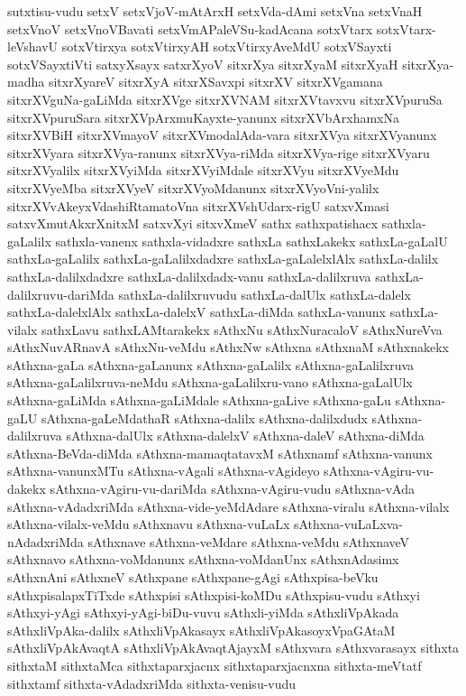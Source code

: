 {sutxtisu-vudu
setxV
setxVjoV-mAtArxH
setxVda-dAmi
setxVna
setxVnaH
setxVnoV
setxVnoVBavati
setxVmAPaleVSu-kadAcana
sotxVtarx
sotxVtarx-leVshavU
sotxVtirxya
sotxVtirxyAH
sotxVtirxyAveMdU
sotxVSayxti
sotxVSayxtiVti
satxyXsayx
satxrXyoV
sitxrXya
sitxrXyaM
sitxrXyaH
sitxrXya-madha
sitxrXyareV
sitxrXyA
sitxrXSavxpi
sitxrXV
sitxrXVgamana
sitxrXVguNa-gaLiMda
sitxrXVge
sitxrXVNAM
sitxrXVtavxvu
sitxrXVpuruSa
sitxrXVpuruSara
sitxrXVpArxmuKayxte-yanunx
sitxrXVbArxhamxNa
sitxrXVBiH
sitxrXVmayoV
sitxrXVmodalAda-vara
sitxrXVya
sitxrXVyanunx
sitxrXVyara
sitxrXVya-ranunx
sitxrXVya-riMda
sitxrXVya-rige
sitxrXVyaru
sitxrXVyalilx
sitxrXVyiMda
sitxrXVyiMdale
sitxrXVyu
sitxrXVyeMdu
sitxrXVyeMba
sitxrXVyeV
sitxrXVyoMdanunx
sitxrXVyoVni-yalilx
sitxrXVvAkeyxVdashiRtamatoVna
sitxrXVshUdarx-rigU
satxvXmasi
satxvXmutAkxrXnitxM
satxvXyi
sitxvXmeV
sathx
sathxpatishacx
sathxla-gaLalilx
sathxla-vanenx
sathxla-vidadxre
sathxLa
sathxLakekx
sathxLa-gaLalU
sathxLa-gaLalilx
sathxLa-gaLalilxdadxre
sathxLa-gaLalelxlAlx
sathxLa-dalilx
sathxLa-dalilxdadxre
sathxLa-dalilxdadx-vanu
sathxLa-dalilxruva
sathxLa-dalilxruvu-dariMda
sathxLa-dalilxruvudu
sathxLa-dalUlx
sathxLa-dalelx
sathxLa-dalelxlAlx
sathxLa-dalelxV
sathxLa-diMda
sathxLa-vanunx
sathxLa-vilalx
sathxLavu
sathxLAMtarakekx
sAthxNu
sAthxNuracaloV
sAthxNureVva
sAthxNuvARnavA
sAthxNu-veMdu
sAthxNw
sAthxna
sAthxnaM
sAthxnakekx
sAthxna-gaLa
sAthxna-gaLanunx
sAthxna-gaLalilx
sAthxna-gaLalilxruva
sAthxna-gaLalilxruva-neMdu
sAthxna-gaLalilxru-vano
sAthxna-gaLalUlx
sAthxna-gaLiMda
sAthxna-gaLiMdale
sAthxna-gaLive
sAthxna-gaLu
sAthxna-gaLU
sAthxna-gaLeMdathaR
sAthxna-dalilx
sAthxna-dalilxdudx
sAthxna-dalilxruva
sAthxna-dalUlx
sAthxna-dalelxV
sAthxna-daleV
sAthxna-diMda
sAthxna-BeVda-diMda
sAthxna-mamaqtatavxM
sAthxnamf
sAthxna-vanunx
sAthxna-vanunxMTu
sAthxna-vAgali
sAthxna-vAgideyo
sAthxna-vAgiru-vu-dakekx
sAthxna-vAgiru-vu-dariMda
sAthxna-vAgiru-vudu
sAthxna-vAda
sAthxna-vAdadxriMda
sAthxna-vide-yeMdAdare
sAthxna-viralu
sAthxna-vilalx
sAthxna-vilalx-veMdu
sAthxnavu
sAthxna-vuLaLx
sAthxna-vuLaLxva-nAdadxriMda
sAthxnave
sAthxna-veMdare
sAthxna-veMdu
sAthxnaveV
sAthxnavo
sAthxna-voMdanunx
sAthxna-voMdanUnx
sAthxnAdasimx
sAthxnAni
sAthxneV
sAthxpane
sAthxpane-gAgi
sAthxpisa-beVku
sAthxpisalapxTiTxde
sAthxpisi
sAthxpisi-koMDu
sAthxpisu-vudu
sAthxyi
sAthxyi-yAgi
sAthxyi-yAgi-biDu-vuvu
sAthxli-yiMda
sAthxliVpAkada
sAthxliVpAka-dalilx
sAthxliVpAkasayx
sAthxliVpAkasoyxVpaGAtaM
sAthxliVpAkAvaqtA
sAthxliVpAkAvaqtAjayxM
sAthxvara
sAthxvarasayx
sithxta
sithxtaM
sithxtaMca
sithxtaparxjacnx
sithxtaparxjacnxna
sithxta-meVtatf
sithxtamf
sithxta-vAdadxriMda
sithxta-venisu-vudu
}
